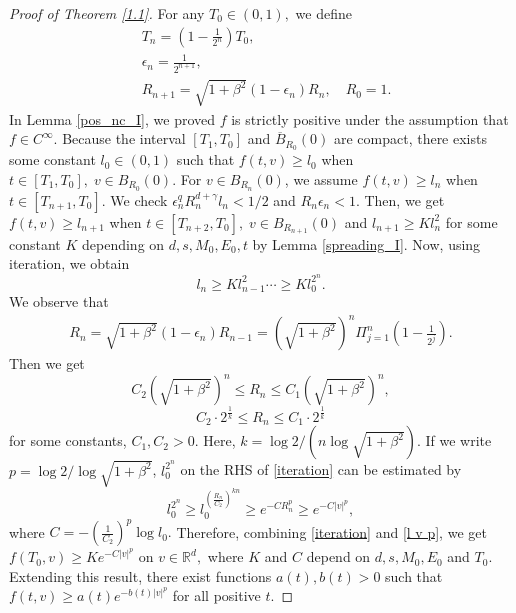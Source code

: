 \documentclass[reqno,10pt]{amsart}
\newcommand{\Be}{\begin{equation}}
\newcommand{\Ee}{\end{equation}}
\numberwithin{equation}{section}
\begin{document}
\begin{proof} [Proof of Theorem \ref{1.1}]
For any $T_0\in (0,1),$ we define
\begin{align*}
     &T_n = (1-\frac{1}{2^{n}})T_0, \\
     &\epsilon_n=\frac{1}{2^{n+1}}, \\
      &R_{n+1}=\sqrt{1+\beta^2}(1-\epsilon_n)R_n, \quad R_0=1.
\end{align*}
In Lemma \ref{pos_nc_I}, we proved $f$ is strictly positive under the assumption that $f \in C^{\infty}.$ Because the interval $[T_1,T_0]$ and $\overline{B}_{R_0}(0)$ are compact, there exists some constant $l_0\in (0,1)$ such that $f(t,v) \geq l_0$ when $t \in [T_1,T_0],\; v \in B_{R_0}(0).$  
For $v \in B_{R_n}(0)$, we assume $f(t,v) \geq l_n$ when $t \in [T_{n+1},T_0]$.  We check $\epsilon_n^q R_n^{d+\gamma}l_n < 1/2$ and $R_n\epsilon_n <1.$ Then, we get $f(t,v) \geq l_{n+1}$ when $t \in [T_{n+2},T_0], \; v \in B_{R_{n+1}}(0) $ and $l_{n+1} \geq K l_n^{2}$ for some constant $K$ depending on $d, s, M_0, E_0, t$ by Lemma \ref{spreading_I}. Now, using iteration, we obtain 
\Be \label{iteration}
	l_n \geq Kl_{n-1}^{2} \cdots \geq Kl_{0}^{2^{n}}. 
\Ee
 \noindent We observe that
\begin{align*}
R_{n}=\sqrt{1+\beta^2}(1-\epsilon_n)R_{n-1}=(\sqrt{1+\beta^2})^{n}\Pi_{j=1}^{n}(1-\frac{1}{2^j}).
\end{align*} 
Then we get
\begin{equation*}
    C_2(\sqrt{1+\beta^2})^{n} \leq R_n \leq C_1(\sqrt{1+\beta^2})^{n},
\end{equation*}
\begin{equation*}
    C_2 \cdot2^{\frac{1}{k}} \leq R_n \leq C_1 \cdot2^{\frac{1}{k}}
\end{equation*}
for some constants, $C_1, C_2>0.$ Here, $k=\log 2/(n\log\sqrt{1+\beta^2}).$ If we write $p=\log 2/\log\sqrt{1+\beta^2}$, $l_0^{2^n}$ on the RHS of \eqref{iteration} can be estimated by 
\Be \label{l v p}
    l_0^{2^n} \geq l_0^{{(\frac{R_n}{C_2})}^{kn}} 
    \geq e^{-C R_n^{p}} \geq e^{-C |v|^{p}},
\Ee
where $C=-({\frac{1}{C_2}})^p \log l_0.$ Therefore, combining \eqref{iteration} and \eqref{l v p}, we get $f(T_0,v) \geq K e^{-C |v|^{p}}$ on $v \in \mathbb{R}^d,$ where $K$ and $C$ depend on $d,s,M_0,E_0$ and $T_0$. 
Extending this result, there exist functions $a(t), b(t)>0$ such that $f(t,v) \geq a(t)e^{-b(t)|v|^{p}}$ for all positive $t.$ 
\end{proof} \vspace{2mm}
\end{document}
